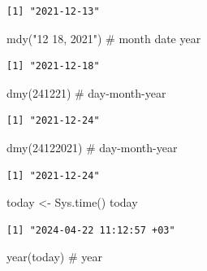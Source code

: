 \documentclass[
  letterpaper,
  DIV=11,
  numbers=noendperiod]{scrreprt}
\newenvironment{Shaded}{\begin{snugshade}}{\end{snugshade}}
\newcommand{\CommentTok}[1]{\textcolor[rgb]{0.37,0.37,0.37}{#1}}
\newcommand{\DecValTok}[1]{\textcolor[rgb]{0.68,0.00,0.00}{#1}}
\newcommand{\FunctionTok}[1]{\textcolor[rgb]{0.28,0.35,0.67}{#1}}
\newcommand{\NormalTok}[1]{\textcolor[rgb]{0.00,0.23,0.31}{#1}}
\newcommand{\OtherTok}[1]{\textcolor[rgb]{0.00,0.23,0.31}{#1}}
\newcommand{\StringTok}[1]{\textcolor[rgb]{0.13,0.47,0.30}{#1}}
\begin{document}
\begin{verbatim}
[1] "2021-12-13"
\end{verbatim}

\begin{Shaded}
\begin{Highlighting}[]
\FunctionTok{mdy}\NormalTok{(}\StringTok{"12 18, 2021"}\NormalTok{) }\CommentTok{\# month date year}
\end{Highlighting}
\end{Shaded}

\begin{verbatim}
[1] "2021-12-18"
\end{verbatim}

\begin{Shaded}
\begin{Highlighting}[]
\FunctionTok{dmy}\NormalTok{(}\DecValTok{241221}\NormalTok{) }\CommentTok{\# day{-}month{-}year}
\end{Highlighting}
\end{Shaded}

\begin{verbatim}
[1] "2021-12-24"
\end{verbatim}

\begin{Shaded}
\begin{Highlighting}[]
\FunctionTok{dmy}\NormalTok{(}\DecValTok{24122021}\NormalTok{) }\CommentTok{\# day{-}month{-}year}
\end{Highlighting}
\end{Shaded}

\begin{verbatim}
[1] "2021-12-24"
\end{verbatim}

\begin{Shaded}
\begin{Highlighting}[]
\NormalTok{today }\OtherTok{\textless{}{-}} \FunctionTok{Sys.time}\NormalTok{()}
\NormalTok{today}
\end{Highlighting}
\end{Shaded}

\begin{verbatim}
[1] "2024-04-22 11:12:57 +03"
\end{verbatim}

\begin{Shaded}
\begin{Highlighting}[]
\FunctionTok{year}\NormalTok{(today) }\CommentTok{\# year}
\end{Highlighting}
\end{Shaded}
\end{document}
